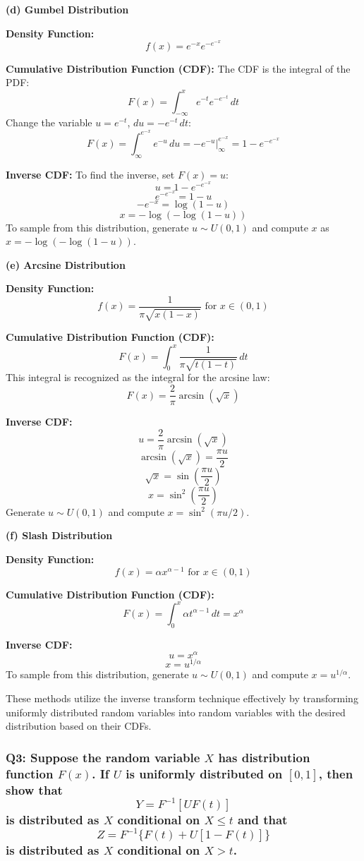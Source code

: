 \documentclass[8pt]{article}
\begin{document}
\textbf{(d) Gumbel Distribution}

\textbf{Density Function:}
\[
f(x) = e^{-x} e^{-e^{-x}}
\]

\textbf{Cumulative Distribution Function (CDF):}
The CDF is the integral of the PDF:
\[
F(x) = \int_{-\infty}^x e^{-t} e^{-e^{-t}} \, dt
\]
Change the variable \( u = e^{-t} \), \( du = -e^{-t} \, dt \):
\[
F(x) = \int_{\infty}^{e^{-x}} e^{-u} \, du = -e^{-u} \bigg|_{\infty}^{e^{-x}} = 1 - e^{-e^{-x}}
\]

\textbf{Inverse CDF:}
To find the inverse, set \( F(x) = u \):
\[
u = 1 - e^{-e^{-x}}
\]
\[
e^{-e^{-x}} = 1 - u
\]
\[
-e^{-x} = \log(1 - u)
\]
\[
x = -\log(-\log(1 - u))
\]
To sample from this distribution, generate \( u \sim U(0, 1) \) and compute \( x \) as \( x = -\log(-\log(1 - u)) \).

\textbf{(e) Arcsine Distribution}

\textbf{Density Function:}
\[
f(x) = \frac{1}{\pi \sqrt{x(1-x)}} \text{ for } x \in (0, 1)
\]

\textbf{Cumulative Distribution Function (CDF):}
\[
F(x) = \int_0^x \frac{1}{\pi \sqrt{t(1-t)}} \, dt
\]
This integral is recognized as the integral for the arcsine law:
\[
F(x) = \frac{2}{\pi} \arcsin(\sqrt{x})
\]

\textbf{Inverse CDF:}
\[
u = \frac{2}{\pi} \arcsin(\sqrt{x})
\]
\[
\arcsin(\sqrt{x}) = \frac{\pi u}{2}
\]
\[
\sqrt{x} = \sin\left(\frac{\pi u}{2}\right)
\]
\[
x = \sin^2\left(\frac{\pi u}{2}\right)
\]
Generate \( u \sim U(0, 1) \) and compute \( x = \sin^2(\pi u / 2) \).

\textbf{(f) Slash Distribution}

\textbf{Density Function:}
\[
f(x) = \alpha x^{\alpha-1} \text{ for } x \in (0, 1)
\]

\textbf{Cumulative Distribution Function (CDF):}
\[
F(x) = \int_0^x \alpha t^{\alpha-1} \, dt = x^\alpha
\]

\textbf{Inverse CDF:}
\[
u = x^\alpha
\]
\[
x = u^{1/\alpha}
\]
To sample from this distribution, generate \( u \sim U(0, 1) \) and compute \( x = u^{1/\alpha} \).

These methods utilize the inverse transform technique effectively by transforming uniformly distributed random variables into random variables with the desired distribution based on their CDFs.

\subsubsection*{Q3:
Suppose the random variable \(X\) has distribution function \(F(x)\). If \(U\) is uniformly distributed on \([0, 1]\), then show that
\[
Y = F^{-1}[UF(t)]
\]
is distributed as \(X\) conditional on \(X \leq t\) and that
\[
Z = F^{-1}\{F(t) + U[1 - F(t)]\}
\]
is distributed as \(X\) conditional on \(X > t\).}
\end{document}
